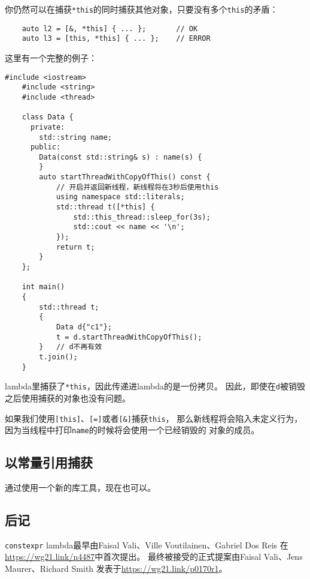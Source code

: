 你仍然可以在捕获\texttt{*this}的同时捕获其他对象，只要没有多个\texttt{this}的矛盾：
\begin{lstlisting}
    auto l2 = [&, *this] { ... };       // OK
    auto l3 = [this, *this] { ... };    // ERROR
\end{lstlisting}
这里有一个完整的例子：
\begin{lstlisting}[frame=single, title=lang/lambdathis.cpp]
    #include <iostream>
    #include <string>
    #include <thread>

    class Data {
      private:
        std::string name;
      public:
        Data(const std::string& s) : name(s) {
        }
        auto startThreadWithCopyOfThis() const {
            // 开启并返回新线程，新线程将在3秒后使用this
            using namespace std::literals;
            std::thread t([*this] {
                std::this_thread::sleep_for(3s);
                std::cout << name << '\n';
            });
            return t;
        }
    };

    int main()
    {
        std::thread t;
        {
            Data d{"c1"};
            t = d.startThreadWithCopyOfThis();
        }   // d不再有效
        t.join();
    }
\end{lstlisting}
lambda里捕获了\texttt{*this}，因此传递进lambda的是一份拷贝。
因此，即使在\texttt{d}被销毁之后使用捕获的对象也没有问题。

如果我们使用\texttt{[this]}、\texttt{[=]}或者\texttt{[\&]}捕获\texttt{this}，
那么新线程将会陷入未定义行为，因为当线程中打印\texttt{name}的时候将会使用一个已经销毁的
对象的成员。

\subsection{以常量引用捕获}
通过使用一个新的库工具，现在也可以。

\subsection{后记}
\texttt{constexpr} lambda最早由Faisal Vali、Ville Voutilainen、Gabriel Dos Reis
在\url{https://wg21.link/n4487}中首次提出。
最终被接受的正式提案由Faisal Vali、Jens Maurer、Richard Smith
发表于\url{https://wg21.link/p0170r1}。